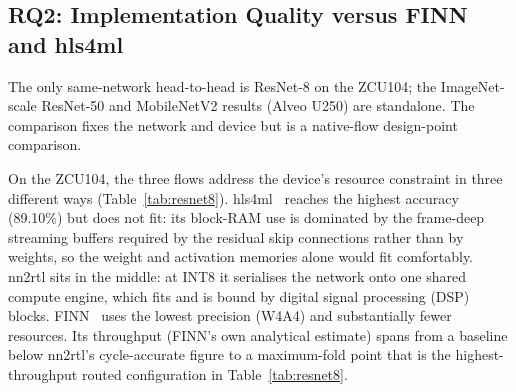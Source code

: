\subsection{RQ2: Implementation Quality versus FINN and hls4ml}\label{sec:rq2}

The only same-network head-to-head is ResNet-8 on the ZCU104; the ImageNet-scale ResNet-50 and MobileNetV2 results (Alveo U250) are standalone. The comparison fixes the network and device but is a native-flow design-point comparison.

On the ZCU104, the three flows address the device's resource constraint in three different ways (Table~\ref{tab:resnet8}). hls4ml~\cite{schulte2026hls4ml, duarte2018hls4ml} reaches the highest accuracy (89.10\%) but does not fit: its block-RAM use is dominated by the frame-deep streaming buffers required by the residual skip connections rather than by weights, so the weight and activation memories alone would fit comfortably. nn2rtl sits in the middle: at INT8 it serialises the network onto one shared compute engine, which fits and is bound by digital signal processing (DSP) blocks. FINN~\cite{umuroglu2017finn, blott2018finnr} uses the lowest precision (W4A4) and substantially fewer resources. Its throughput (FINN's own analytical estimate) spans from a baseline below nn2rtl's cycle-accurate figure to a maximum-fold point that is the highest-throughput routed configuration in Table~\ref{tab:resnet8}.


